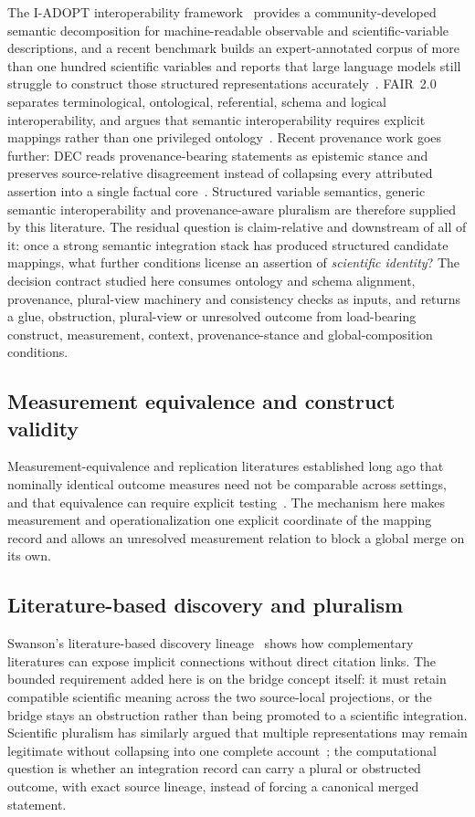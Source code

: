 The I-ADOPT interoperability framework~\cite{iadopt2021} provides a
community-developed semantic decomposition for machine-readable observable and
scientific-variable descriptions, and a recent benchmark builds an
expert-annotated corpus of more than one hundred scientific variables and
reports that large language models still struggle to construct those
structured representations accurately~\cite{iadoptbench2026}. FAIR~2.0
separates terminological, ontological, referential, schema and logical
interoperability, and argues that semantic interoperability requires explicit
mappings rather than one privileged ontology~\cite{fair2_2024}. Recent
provenance work goes further: DEC reads provenance-bearing statements as
epistemic stance and preserves source-relative disagreement instead of
collapsing every attributed assertion into a single factual
core~\cite{dec2026}. Structured variable semantics, generic semantic
interoperability and provenance-aware pluralism are therefore supplied by this
literature. The residual question is claim-relative and downstream of all of
it: once a strong semantic integration stack has produced structured candidate
mappings, what further conditions license an assertion of \emph{scientific
identity}? The decision contract studied here consumes ontology and schema
alignment, provenance, plural-view machinery and consistency checks as inputs,
and returns a glue, obstruction, plural-view or unresolved outcome from
load-bearing construct, measurement, context, provenance-stance and
global-composition conditions.

\subsection{Measurement equivalence and construct validity}

Measurement-equivalence and replication literatures established long ago that
nominally identical outcome measures need not be comparable across settings,
and that equivalence can require explicit testing~\cite{jilke2017measurement}.
The mechanism here makes measurement and operationalization one explicit
coordinate of the mapping record and allows an unresolved measurement relation
to block a global merge on its own.

\subsection{Literature-based discovery and pluralism}

Swanson's literature-based discovery
lineage~\cite{swanson1986,swanson1997interactive} shows how complementary
literatures can expose implicit connections without direct citation links. The
bounded requirement added here is on the bridge concept itself: it must retain
compatible scientific meaning across the two source-local projections, or the
bridge stays an obstruction rather than being promoted to a scientific
integration. Scientific pluralism has similarly argued that multiple
representations may remain legitimate without collapsing into one complete
account~\cite{kellert2006,cartwright1999}; the computational question is
whether an integration record can carry a plural or obstructed outcome, with
exact source lineage, instead of forcing a canonical merged statement.

